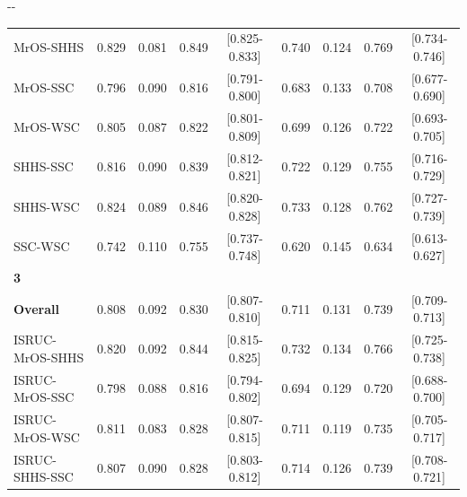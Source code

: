 \begin{table}
\begin{adjustwidth*}{}{-\marginparwidth-\marginparsep}
\begin{threeparttable}
\begin{tabular}{@{}lcccccccc@{}}
\acs{MrOS}-\acs{SHHS}                 & 0.829         & 0.081       & 0.849           & [0.825-0.833]         & 0.740         & 0.124       & 0.769           & [0.734-0.746]         \\
\acs{MrOS}-\acs{SSC}                  & 0.796         & 0.090       & 0.816           & [0.791-0.800]         & 0.683         & 0.133       & 0.708           & [0.677-0.690]         \\
\acs{MrOS}-\acs{WSC}                  & 0.805         & 0.087       & 0.822           & [0.801-0.809]         & 0.699         & 0.126       & 0.722           & [0.693-0.705]         \\
\acs{SHHS}-\acs{SSC}                  & 0.816         & 0.090       & 0.839           & [0.812-0.821]         & 0.722         & 0.129       & 0.755           & [0.716-0.729]         \\
\acs{SHHS}-\acs{WSC}                  & 0.824         & 0.089       & 0.846           & [0.820-0.828]         & 0.733         & 0.128       & 0.762           & [0.727-0.739]         \\
\acs{SSC}-\acs{WSC}                   & 0.742         & 0.110       & 0.755           & [0.737-0.748]         & 0.620         & 0.145       & 0.634           & [0.613-0.627]         \\
\textbf{3}                &               &             &                 &                       &               &             &                 &                       \\
\textbf{Overall}          & 0.808         & 0.092       & 0.830           & [0.807-0.810]         & 0.711         & 0.131       & 0.739           & [0.709-0.713]         \\
\acs{ISRUC}-\acs{MrOS}-\acs{SHHS}           & 0.820         & 0.092       & 0.844           & [0.815-0.825]         & 0.732         & 0.134       & 0.766           & [0.725-0.738]         \\
\acs{ISRUC}-\acs{MrOS}-\acs{SSC}            & 0.798         & 0.088       & 0.816           & [0.794-0.802]         & 0.694         & 0.129       & 0.720           & [0.688-0.700]         \\
\acs{ISRUC}-\acs{MrOS}-\acs{WSC}            & 0.811         & 0.083       & 0.828           & [0.807-0.815]         & 0.711         & 0.119       & 0.735           & [0.705-0.717]         \\
\acs{ISRUC}-\acs{SHHS}-\acs{SSC}            & 0.807         & 0.090       & 0.828           & [0.803-0.812]         & 0.714         & 0.126       & 0.739           & [0.708-0.721]         \\

\end{tabular}
\end{threeparttable}
\end{adjustwidth*}
\end{table}
